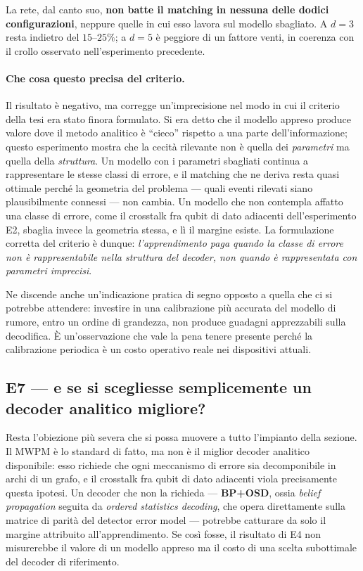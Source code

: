 La rete, dal canto suo, \textbf{non batte il matching in nessuna delle dodici configurazioni}, neppure quelle in cui esso lavora sul modello sbagliato. A $d=3$ resta indietro del $15$--$25\%$; a $d=5$ è peggiore di un fattore venti, in coerenza con il crollo osservato nell'esperimento precedente.

\paragraph{Che cosa questo precisa del criterio.}
Il risultato è negativo, ma corregge un'imprecisione nel modo in cui il criterio della tesi era stato finora formulato. Si era detto che il modello appreso produce valore dove il metodo analitico è ``cieco'' rispetto a una parte dell'informazione; questo esperimento mostra che la cecità rilevante non è quella dei \emph{parametri} ma quella della \emph{struttura}. Un modello con i parametri sbagliati continua a rappresentare le stesse classi di errore, e il matching che ne deriva resta quasi ottimale perché la geometria del problema --- quali eventi rilevati siano plausibilmente connessi --- non cambia. Un modello che non contempla affatto una classe di errore, come il crosstalk fra qubit di dato adiacenti dell'esperimento E2, sbaglia invece la geometria stessa, e lì il margine esiste. La formulazione corretta del criterio è dunque: \emph{l'apprendimento paga quando la classe di errore non è rappresentabile nella struttura del decoder, non quando è rappresentata con parametri imprecisi}.

Ne discende anche un'indicazione pratica di segno opposto a quella che ci si potrebbe attendere: investire in una calibrazione più accurata del modello di rumore, entro un ordine di grandezza, non produce guadagni apprezzabili sulla decodifica. È un'osservazione che vale la pena tenere presente perché la calibrazione periodica è un costo operativo reale nei dispositivi attuali.

\subsection{E7 --- e se si scegliesse semplicemente un decoder analitico migliore?}
\label{subsec:neural_bposd}

Resta l'obiezione più severa che si possa muovere a tutto l'impianto della sezione. Il \ac{MWPM} è lo standard di fatto, ma non è il miglior decoder analitico disponibile: esso richiede che ogni meccanismo di errore sia decomponibile in archi di un grafo, e il crosstalk fra qubit di dato adiacenti viola precisamente questa ipotesi. Un decoder che non la richieda --- \textbf{BP+OSD}, ossia \textit{belief propagation} seguita da \textit{ordered statistics decoding}, che opera direttamente sulla matrice di parità del detector error model \cite{panteleev2021, roffe2020} --- potrebbe catturare da solo il margine attribuito all'apprendimento. Se così fosse, il risultato di E4 non misurerebbe il valore di un modello appreso ma il costo di una scelta subottimale del decoder di riferimento.

